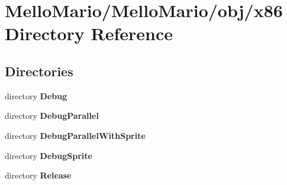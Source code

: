 \section{Mello\+Mario/\+Mello\+Mario/obj/x86 Directory Reference}
\label{dir_1e943a2f6785d9b32b19b7a8abe499c4}
\subsection*{Directories}
\begin{DoxyCompactItemize}
\item 
directory \textbf{ Debug}
\item 
directory \textbf{ Debug\+Parallel}
\item 
directory \textbf{ Debug\+Parallel\+With\+Sprite}
\item 
directory \textbf{ Debug\+Sprite}
\item 
directory \textbf{ Release}
\end{DoxyCompactItemize}
